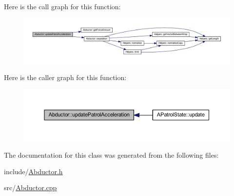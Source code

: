 Here is the call graph for this function\+:
\nopagebreak
\begin{figure}[H]
\begin{center}
\leavevmode
\includegraphics[width=350pt]{class_abductor_a24cc63afd005eef7d1ed694933a2c2a0_cgraph}
\end{center}
\end{figure}
Here is the caller graph for this function\+:
\nopagebreak
\begin{figure}[H]
\begin{center}
\leavevmode
\includegraphics[width=350pt]{class_abductor_a24cc63afd005eef7d1ed694933a2c2a0_icgraph}
\end{center}
\end{figure}


The documentation for this class was generated from the following files\+:\begin{DoxyCompactItemize}
\item 
include/\hyperlink{_abductor_8h}{Abductor.\+h}\item 
src/\hyperlink{_abductor_8cpp}{Abductor.\+cpp}\end{DoxyCompactItemize}

